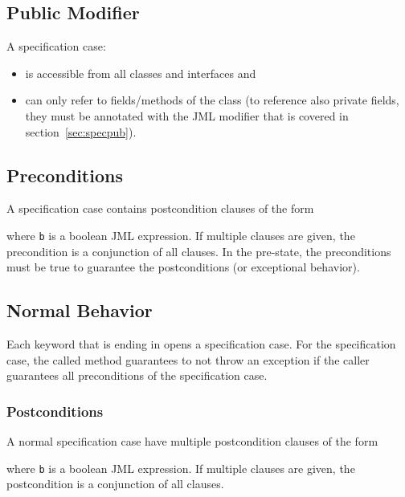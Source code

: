 		\subsection{Public Modifier}
			A  specification case:
			\begin{itemize}
				\item is accessible from all classes and interfaces and
				\item can only refer to  fields/methods of the class (to reference also private fields, they must be annotated with the JML modifier  that is covered in section~\ref{sec:specpub}).
			\end{itemize}
		
		\subsection{Preconditions}
			\label{sec:precond}
		
			A specification case contains postcondition clauses of the form
			\begin{center}
			\end{center}
			where \texttt{b} is a boolean JML expression. If multiple clauses are given, the precondition is a conjunction of all clauses. In the pre-state, the preconditions must be true to guarantee the postconditions (or exceptional behavior).

		\subsection{Normal Behavior}
			Each keyword that is ending in  opens a specification case. For the  specification case, the called method guarantees to not throw an exception if the caller guarantees all preconditions of the specification case.
			
			\subsubsection{Postconditions}
				\label{sec:postcond1}
			
				A normal specification case have multiple postcondition clauses of the form
				\begin{center}
				\end{center}
				where \texttt{b} is a boolean JML expression. If multiple clauses are given, the postcondition is a conjunction of all clauses.
				
